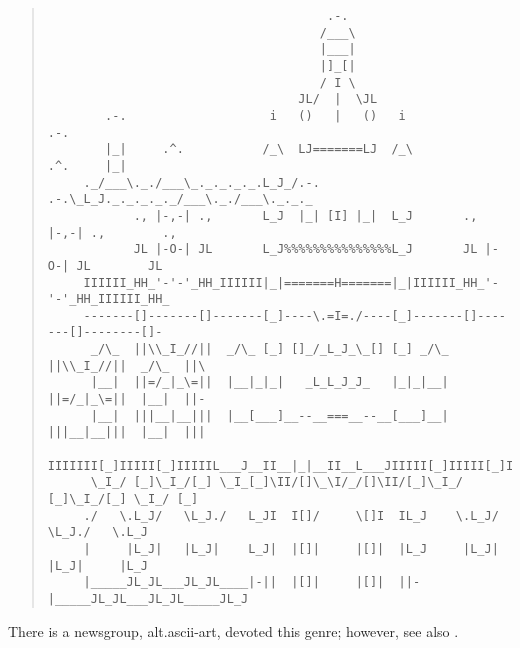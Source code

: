 \begin{figure*}
    \begin{quote}
        \begin{verbatim}
                                       .-.
                                      /___\
                                      |___|
                                      |]_[|
                                      / I \
                                   JL/  |  \JL
        .-.                    i   ()   |   ()   i                    .-.
        |_|     .^.           /_\  LJ=======LJ  /_\           .^.     |_|
     ._/___\._./___\_._._._._.L_J_/.-.     .-.\_L_J._._._._._/___\._./___\._._._
            ., |-,-| .,       L_J  |_| [I] |_|  L_J       ., |-,-| .,        .,
            JL |-O-| JL       L_J%%%%%%%%%%%%%%%L_J       JL |-O-| JL        JL
     IIIIII_HH_'-'-'_HH_IIIIII|_|=======H=======|_|IIIIII_HH_'-'-'_HH_IIIIII_HH_
     -------[]-------[]-------[_]----\.=I=./----[_]-------[]-------[]--------[]-
      _/\_  ||\\_I_//||  _/\_ [_] []_/_L_J_\_[] [_] _/\_  ||\\_I_//||  _/\_  ||\
      |__|  ||=/_|_\=||  |__|_|_|   _L_L_J_J_   |_|_|__|  ||=/_|_\=||  |__|  ||-
      |__|  |||__|__|||  |__[___]__--__===__--__[___]__|  |||__|__|||  |__|  |||
     IIIIIII[_]IIIII[_]IIIIIL___J__II__|_|__II__L___JIIIII[_]IIIII[_]IIIIIIII[_]
      \_I_/ [_]\_I_/[_] \_I_[_]\II/[]\_\I/_/[]\II/[_]\_I_/ [_]\_I_/[_] \_I_/ [_]
     ./   \.L_J/   \L_J./   L_JI  I[]/     \[]I  IL_J    \.L_J/   \L_J./   \.L_J
     |     |L_J|   |L_J|    L_J|  |[]|     |[]|  |L_J     |L_J|   |L_J|     |L_J
     |_____JL_JL___JL_JL____|-||  |[]|     |[]|  ||-|_____JL_JL___JL_JL_____JL_J
        \end{verbatim}
    \end{quote}
\end{figure*}

There is a newsgroup, alt.ascii-art, devoted this genre; however, see also .

